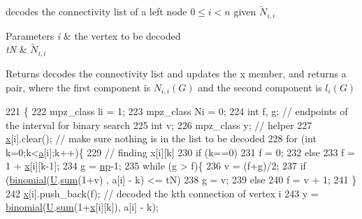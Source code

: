 decodes the connectivity list of a left node $0 \leq i < n$ given $\tilde{N}_{i,i}$ 


\begin{DoxyParams}{Parameters}
{\em i} & the vertex to be decoded \\
\hline
{\em tN} & $\tilde{N}_{i,i}$ \\
\hline
\end{DoxyParams}
\begin{DoxyReturn}{Returns}
decodes the connectivity list and updates the x member, and returns a pair, where the first component is $N_{i,i}(G)$ and the second component is $l_{i}(G)$ 
\end{DoxyReturn}

\begin{DoxyCode}
221 \{
222   mpz\_class li = 1;
223   mpz\_class Ni = 0;
224   \textcolor{keywordtype}{int} f, g; \textcolor{comment}{// endpoints of the interval for binary search}
225   \textcolor{keywordtype}{int} v;
226   mpz\_class y; \textcolor{comment}{// helper}
227   \hyperlink{classb__graph__decoder_a6bba2e67984f9733fc60c40dd4956587}{x}[i].clear(); \textcolor{comment}{// make sure nothing is in the list to be decoded}
228   \textcolor{keywordflow}{for} (\textcolor{keywordtype}{int} k=0;k<\hyperlink{classb__graph__decoder_afcf783e4199fb8f9d6828db08bb12333}{a}[i];k++)\{
229     \textcolor{comment}{// finding x[i][k]}
230     \textcolor{keywordflow}{if} (k==0)
231       f = 0;
232     \textcolor{keywordflow}{else}
233       f = 1 + \hyperlink{classb__graph__decoder_a6bba2e67984f9733fc60c40dd4956587}{x}[i][k-1];
234     g = \hyperlink{classb__graph__decoder_a7eca48cf8793e722d1b29dbdc9fd2dca}{np}-1;
235     \textcolor{keywordflow}{while} (g > f)\{
236       v = (f+g)/2;
237       \textcolor{keywordflow}{if} (\hyperlink{compression__helper_8cpp_acecca9cb279d3b3d82915a07d67818cf}{binomial}(\hyperlink{classb__graph__decoder_ae15e74088bb60a096562a9bdaf380f2c}{U}.\hyperlink{classreverse__fenwick__tree_a672731fd6395b4853430073a099a80e6}{sum}(1+v) , a[i] - k) <= tN)
238         g = v;
239       \textcolor{keywordflow}{else}
240         f = v + 1;
241     \}
242     \hyperlink{classb__graph__decoder_a6bba2e67984f9733fc60c40dd4956587}{x}[i].push\_back(f); \textcolor{comment}{// decoded the kth connection of vertex i}
243     y = \hyperlink{compression__helper_8cpp_acecca9cb279d3b3d82915a07d67818cf}{binomial}(\hyperlink{classb__graph__decoder_ae15e74088bb60a096562a9bdaf380f2c}{U}.\hyperlink{classreverse__fenwick__tree_a672731fd6395b4853430073a099a80e6}{sum}(1+\hyperlink{classb__graph__decoder_a6bba2e67984f9733fc60c40dd4956587}{x}[i][k]), a[i] - k);

\end{DoxyCode}
